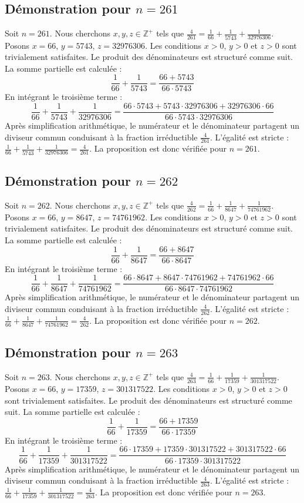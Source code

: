 \documentclass[11pt,a4paper]{article}
\begin{document}
\subsection{Démonstration pour $n = 261$}
Soit $n = 261$. Nous cherchons $x, y, z \in \mathbb{Z}^{+}$ tels que $\frac{4}{261} = \frac{1}{66} + \frac{1}{5743} + \frac{1}{32976306}$.
Posons $x = 66$, $y = 5743$, $z = 32976306$.
Les conditions $x > 0$, $y > 0$ et $z > 0$ sont trivialement satisfaites.
Le produit des dénominateurs est structuré comme suit. La somme partielle est calculée :
$$ \frac{1}{66} + \frac{1}{5743} = \frac{66+5743}{66 \cdot 5743} $$
En intégrant le troisième terme :
$$ \frac{1}{66} + \frac{1}{5743} + \frac{1}{32976306} = \frac{66 \cdot 5743 + 5743 \cdot 32976306 + 32976306 \cdot 66}{66 \cdot 5743 \cdot 32976306} $$
Après simplification arithmétique, le numérateur et le dénominateur partagent un diviseur commun conduisant à la fraction irréductible $\frac{4}{261}$.
L'égalité est stricte : $\frac{1}{66} + \frac{1}{5743} + \frac{1}{32976306} = \frac{4}{261}$.
La proposition est donc vérifiée pour $n = 261$.
\subsection{Démonstration pour $n = 262$}
Soit $n = 262$. Nous cherchons $x, y, z \in \mathbb{Z}^{+}$ tels que $\frac{4}{262} = \frac{1}{66} + \frac{1}{8647} + \frac{1}{74761962}$.
Posons $x = 66$, $y = 8647$, $z = 74761962$.
Les conditions $x > 0$, $y > 0$ et $z > 0$ sont trivialement satisfaites.
Le produit des dénominateurs est structuré comme suit. La somme partielle est calculée :
$$ \frac{1}{66} + \frac{1}{8647} = \frac{66+8647}{66 \cdot 8647} $$
En intégrant le troisième terme :
$$ \frac{1}{66} + \frac{1}{8647} + \frac{1}{74761962} = \frac{66 \cdot 8647 + 8647 \cdot 74761962 + 74761962 \cdot 66}{66 \cdot 8647 \cdot 74761962} $$
Après simplification arithmétique, le numérateur et le dénominateur partagent un diviseur commun conduisant à la fraction irréductible $\frac{4}{262}$.
L'égalité est stricte : $\frac{1}{66} + \frac{1}{8647} + \frac{1}{74761962} = \frac{4}{262}$.
La proposition est donc vérifiée pour $n = 262$.
\subsection{Démonstration pour $n = 263$}
Soit $n = 263$. Nous cherchons $x, y, z \in \mathbb{Z}^{+}$ tels que $\frac{4}{263} = \frac{1}{66} + \frac{1}{17359} + \frac{1}{301317522}$.
Posons $x = 66$, $y = 17359$, $z = 301317522$.
Les conditions $x > 0$, $y > 0$ et $z > 0$ sont trivialement satisfaites.
Le produit des dénominateurs est structuré comme suit. La somme partielle est calculée :
$$ \frac{1}{66} + \frac{1}{17359} = \frac{66+17359}{66 \cdot 17359} $$
En intégrant le troisième terme :
$$ \frac{1}{66} + \frac{1}{17359} + \frac{1}{301317522} = \frac{66 \cdot 17359 + 17359 \cdot 301317522 + 301317522 \cdot 66}{66 \cdot 17359 \cdot 301317522} $$
Après simplification arithmétique, le numérateur et le dénominateur partagent un diviseur commun conduisant à la fraction irréductible $\frac{4}{263}$.
L'égalité est stricte : $\frac{1}{66} + \frac{1}{17359} + \frac{1}{301317522} = \frac{4}{263}$.
La proposition est donc vérifiée pour $n = 263$.
\end{document}
